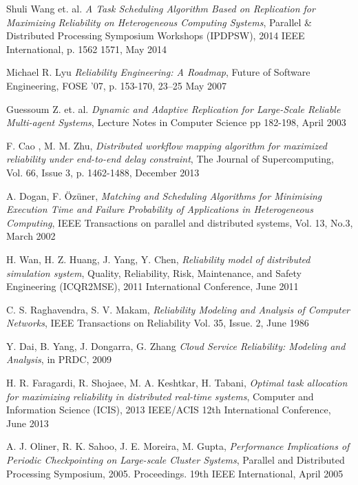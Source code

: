 \documentclass{cslthse-msc}
\begin{document}
\begin{thebibliography}{50}
	Shuli Wang et. al.
	\emph{A Task Scheduling Algorithm Based on Replication for Maximizing Reliability on Heterogeneous Computing Systems},
	Parallel \& Distributed Processing Symposium Workshops (IPDPSW), 2014 IEEE International, p. 1562 1571, 
	May 2014

	Michael R. Lyu
	\emph{Reliability Engineering: A Roadmap},
	Future of Software Engineering, FOSE ’07, p. 153-170,
	23–25 May 2007
	
	Guessoum Z. et. al.
	\emph{Dynamic and Adaptive Replication for Large-Scale Reliable Multi-agent Systems},
	Lecture Notes in Computer Science pp 182-198,
	April 2003

	F. Cao , M. M. Zhu,
	\emph{Distributed workflow mapping algorithm for maximized reliability under end-to-end delay constraint},
	The Journal of Supercomputing, Vol. 66, Issue 3, p. 1462-1488,
	December 2013

	A. Dogan, F. Özüner,
	\emph{Matching and Scheduling Algorithms for Minimising Execution Time and Failure Probability of Applications in Heterogeneous Computing},
	IEEE Transactions on parallel and distributed systems, Vol. 13, No.3,
	March 2002

	H. Wan, H. Z. Huang, J. Yang, Y. Chen,
	\emph{Reliability model of distributed simulation system},
	Quality, Reliability, Risk, Maintenance, and Safety Engineering (ICQR2MSE), 2011 International Conference,
	June 2011

	C. S. Raghavendra, S. V. Makam,
	\emph{Reliability Modeling and Analysis of Computer Networks},
	IEEE Transactions on Reliability Vol. 35, Issue. 2,
	June 1986

	Y. Dai, B. Yang, J. Dongarra, G. Zhang
	\emph{Cloud Service Reliability: Modeling and Analysis},
	in PRDC, 2009	

	H. R. Faragardi, R. Shojaee, M. A. Keshtkar, H. Tabani,
	\emph{Optimal task allocation for maximizing reliability in distributed real-time systems},
	Computer and Information Science (ICIS), 2013 IEEE/ACIS 12th International Conference,
	June 2013

	A. J. Oliner, R. K. Sahoo, J. E. Moreira, M. Gupta,
	\emph{Performance Implications of Periodic Checkpointing on Large-scale Cluster Systems},
	Parallel and Distributed Processing Symposium, 2005. Proceedings. 19th IEEE International,
	April 2005


\end{thebibliography}
\end{document}
